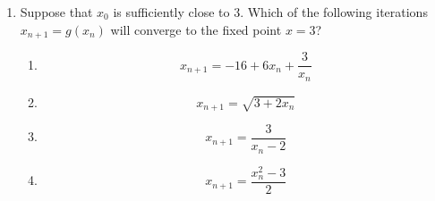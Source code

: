\documentclass[journal]{IEEEtran}
\numberwithin{figure}{enumi}
\begin{document}
\begin{enumerate}
\item Suppose that \( x_0 \) is sufficiently close to 3. Which of the following iterations \( x_{n+1} = g(x_n) \) will converge to the fixed point \( x = 3 \)?

\begin{enumerate}
    \item 
    \begin{equation}
    x_{n+1} = -16 + 6x_n + \frac{3}{x_n}
    \end{equation}
    
    \item 
    \begin{equation}
    x_{n+1} = \sqrt{3 + 2x_n}
    \end{equation}
    
    \item 
    \begin{equation}
    x_{n+1} = \frac{3}{x_n - 2}
    \end{equation}
    
    \item
    \begin{equation}
    x_{n+1} = \frac{x_n^2 - 3}{2}
    \end{equation}
\end{enumerate}



\end{enumerate}
\end{document}
